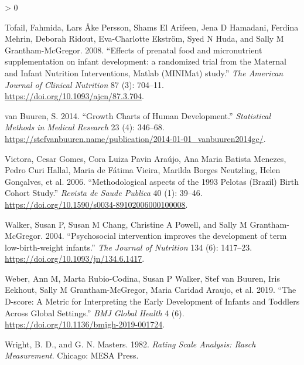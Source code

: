 \documentclass[
]{book}
\newlength{\cslhangindent}
\newenvironment{CSLReferences}[2] %
 {%
  \setlength{\parindent}{0pt}
  \ifodd #1 \everypar{\setlength{\hangindent}{\cslhangindent}}\ignorespaces\fi
  \ifnum #2 > 0
  \setlength{\parskip}{#2\baselineskip}
  \fi
 }%
 {}
\begin{document}
\begin{CSLReferences}{1}{0}
\leavevmode\hypertarget{ref-Tofail2008}{}%
Tofail, Fahmida, Lars Åke Persson, Shams El Arifeen, Jena D Hamadani, Ferdina Mehrin, Deborah Ridout, Eva-Charlotte Ekström, Syed N Huda, and Sally M Grantham-McGregor. 2008. {``{Effects of prenatal food and micronutrient supplementation on infant development: a randomized trial from the Maternal and Infant Nutrition Interventions, Matlab (MINIMat) study}.''} \emph{The American Journal of Clinical Nutrition} 87 (3): 704--11. \url{https://doi.org/10.1093/ajcn/87.3.704}.

\leavevmode\hypertarget{ref-vanbuuren2014}{}%
van Buuren, S. 2014. {``Growth Charts of Human Development.''} \emph{Statistical Methods in Medical Research} 23 (4): 346--68. \url{https://stefvanbuuren.name/publication/2014-01-01_vanbuuren2014gc/}.

\leavevmode\hypertarget{ref-Victora2006}{}%
Victora, Cesar Gomes, Cora Luiza Pavin Araújo, Ana Maria Batista Menezes, Pedro Curi Hallal, Maria de Fátima Vieira, Marilda Borges Neutzling, Helen Gonçalves, et al. 2006. {``{Methodological aspects of the 1993 Pelotas (Brazil) Birth Cohort Study.}''} \emph{Revista de Saude Publica} 40 (1): 39--46. \url{https://doi.org/10.1590/s0034-89102006000100008}.

\leavevmode\hypertarget{ref-Walker2004}{}%
Walker, Susan P, Susan M Chang, Christine A Powell, and Sally M Grantham-McGregor. 2004. {``{Psychosocial intervention improves the development of term low-birth-weight infants.}''} \emph{The Journal of Nutrition} 134 (6): 1417--23. \url{https://doi.org/10.1093/jn/134.6.1417}.

\leavevmode\hypertarget{ref-Weber2019}{}%
Weber, Ann M, Marta Rubio-Codina, Susan P Walker, Stef van Buuren, Iris Eekhout, Sally M Grantham-McGregor, Maria Caridad Araujo, et al. 2019. {``The {D-score}: A Metric for Interpreting the Early Development of Infants and Toddlers Across Global Settings.''} \emph{BMJ Global Health} 4 (6). \url{https://doi.org/10.1136/bmjgh-2019-001724}.

\leavevmode\hypertarget{ref-wright1982}{}%
Wright, B. D., and G. N. Masters. 1982. \emph{Rating Scale Analysis: Rasch Measurement}. Chicago: MESA Press.

\end{CSLReferences}
\end{document}
